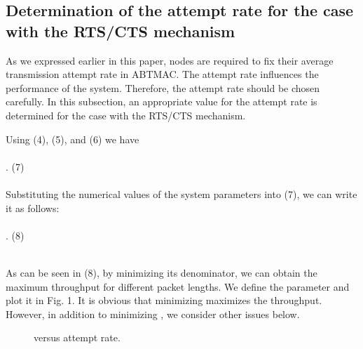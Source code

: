 \documentclass[10pt,twocolumn,oneside,submit]{JCNtran}
\begin{document}
\subsection{Determination of the attempt rate for the case with the RTS/CTS mechanism}
As we expressed earlier in this paper, nodes are required to fix their average transmission attempt rate in ABTMAC. The attempt rate influences the performance of the system. Therefore, the attempt rate should be chosen carefully. In this subsection, an appropriate value for the attempt rate is determined for the case with the RTS/CTS mechanism.

\par Using (4), (5), and (6) we have\\
\\
. \hfill(7) \\
\\
Substituting the numerical values of the system parameters into (7), we can write it as follows:\\
\\
. \hfill(8) \\
\\
\par As can be seen in (8), by minimizing its denominator, we can obtain the maximum throughput for different packet lengths. We define the parameter  and plot it in Fig. 1. It is obvious that minimizing  maximizes the throughput. However, in addition to minimizing , we consider other issues below.
\begin{figure}[!t]
\begin{center}
\epsfxsize=8cm \leavevmode{} \caption{ versus attempt rate.} \label{fig:1}
\end{center}
\end{figure}
\end{document}
